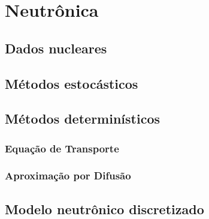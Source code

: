 \section{Neutrônica}
\label{sec:neutronica}

\subsection{Dados nucleares}
\label{subsec:dn}

\subsection{Métodos estocásticos}
\label{subsec:mc}

\subsection{Métodos determinísticos}
\label{subsec:det}

\subsubsection{Equação de Transporte}
\label{ssubsec:transp}

\subsubsection{Aproximação por Difusão}
\label{ssubsec:difusao}

\subsection{Modelo neutrônico discretizado}
\label{subsec:modelon}
